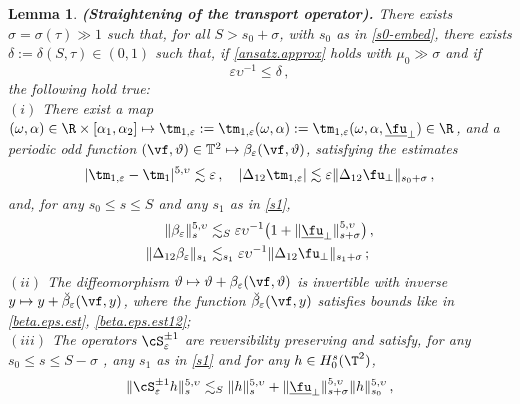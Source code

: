 \documentclass[a4paper,reqno,10pt]{article}
\newtheorem{lem}{Lemma}[section]
\begin{document}
\begin{lem}\label{almost.straight.lemma}
	{\bf (Straightening of the transport operator).}
	There exists $\sigma=\sigma(\tau)\gg 1$  such that, for all $S>s_0+\sigma$, with $s_0$ as in \eqref{s0-embed}, there exists $\delta:=\delta(S,\tau) \in (0,1)$ such that, if \eqref{ansatz.approx} holds with $\mu_{0} \gg \sigma$ and if
	\begin{equation}
		\varepsilon \upsilon^{-1} \leq \delta\,,
	\end{equation}
	the following hold true:
	\\[1mm]
	\noindent $(i)$ There exist a map $(\omega,\alpha)\in \R\times [\alpha_{1},\alpha_{2}]\mapsto\tm_{1,\varepsilon}:= \tm_{1,\varepsilon}(\omega,\alpha):= \tm_{1,\varepsilon}(\omega,\alpha,\underline{\fu}_{\perp})\in\R$,  and a periodic odd function $(\vf,\vartheta)\in\mathbb{T}^2\mapsto\beta_{\varepsilon}(\vf,\vartheta)$, satisfying the estimates
	\begin{equation}
		|\tm_{1,\varepsilon}-\tm_{1}|^{5,\upsilon} \lesssim \varepsilon \,, \quad |\Delta_{12}\tm_{1,\varepsilon}| \lesssim \varepsilon \| \Delta_{12}\fu_{\perp} \|_{s_0+\sigma}\,, \label{tm.1e.est}
	\end{equation}
	and, for any $s_0 \leq s \leq S$ and any $s_1$ as in \eqref{s1},
	\begin{align}
		\| \beta_{\varepsilon}\|_{s}^{5,\upsilon}&  \lesssim_{S}\varepsilon\upsilon^{-1} \big( 1+ \| \underline{\fu}_{\perp} \|_{s+\sigma}^{5,\upsilon} \big) \,, \label{beta.eps.est} \\
		\| \Delta_{12} \beta_{\varepsilon}\|_{s_1} &  \lesssim_{s_1}\varepsilon\upsilon^{-1} \| \Delta_{12}\fu_{\perp} \|_{s_1+\sigma} \,; \label{beta.eps.est12}
	\end{align}
	\noindent $(ii)$ The diffeomorphism $\vartheta \mapsto \vartheta + \beta_{\varepsilon}(\vf,\vartheta)$ is invertible with inverse $y \mapsto y + \breve{\beta}_{\varepsilon}(\vf,y)$, where the function $\breve{\beta}_{\varepsilon}(\vf,y)$ satisfies bounds like in \eqref{beta.eps.est}, \eqref{beta.eps.est12};
	\\[1mm]
    \noindent $(iii)$ The operators $\cS_{\varepsilon}^{\pm 1}$ are reversibility preserving and satisfy,  for any $s_0\leq s\leq S-\sigma$ , any $s_1$ as in \eqref{s1} and for any $h\in H_{0}^s(\T^2)$,
	\begin{align}
		&	\| \cS_{\varepsilon}^{\pm 1}h \|_{s}^{5,\upsilon} \lesssim_{S} \| h \|_{s}^{5,\upsilon} +  \| \underline{\fu}_{\perp} \|_{s+\sigma}^{5,\upsilon}  \| h\|_{s_0}^{5,\upsilon} \,, \\

\end{align}
\end{lem}
\end{document}
